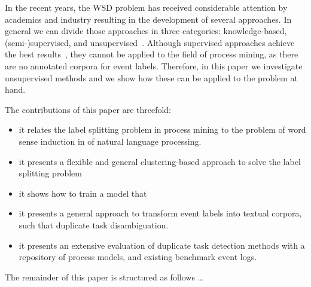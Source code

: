 In the recent years, the WSD problem has received considerable attention by academics and industry resulting in the development of several approaches. In general we can divide those approaches in three categories: knowledge-based, (semi-)supervised, and unsupervised~\cite{DBLP:journals/csur/Navigli09}. Although supervised approaches achieve the best results~\cite{iacobacci2016embeddings}, they cannot be applied to the field of process mining, as there are no annotated corpora for event labels. Therefore, in this paper we investigate unsupervised methods and we show how these can be applied to the problem at hand. 


The contributions of this paper are threefold:
\begin{itemize}
	\item it relates the label splitting problem in process mining to the problem of word sense induction in  of natural language processing.
	\item it presents a flexible and general clustering-based approach to solve the label splitting problem
	\item it shows how to train a model that 
	\item it presents a general approach to transform event labels into textual corpora, such that duplicate task disambiguation.
	\item it presents an extensive evaluation of duplicate task detection methods with a repository of process models, and existing benchmark event logs.
\end{itemize}

The remainder of this paper is structured as follows \ldots